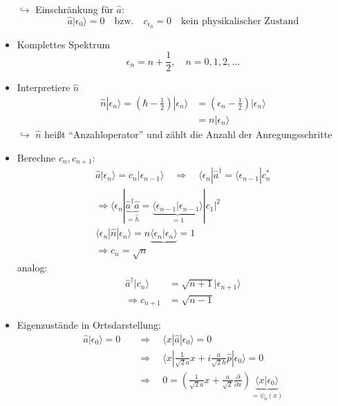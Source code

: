 \documentclass[10pt,article,colorback,accentcolor=tud9d]{scrartcl}
\begin{document}
\begin{itemize}
    $\hookrightarrow$ Einschränkung für $\hat{a}$:
    \begin{equation}
    \hat{a}|\epsilon_0\rangle=0 \quad \text{bzw.}\quad c_{\epsilon_0}=0 \quad \text{kein physikalischer Zustand}
    \end{equation}
  \item Komplettes Spektrum
    \begin{equation}
    \epsilon_n=n+\frac{1}{2},\quad n=0,1,2,...
    \end{equation}
  \item Interpretiere $\hat{n}$
    \begin{align}
    \hat{n}|\epsilon_n\rangle=\left(\hbar-\frac{1}{2}\right)|\epsilon_n\rangle&=\left(\epsilon_n-\frac{1}{2}\right)|\epsilon_n\rangle\\
    &=n|\epsilon_n\rangle
    \end{align}
    $\hookrightarrow$ $\hat{n}$ heißt "`Anzahloperator"' und zählt die Anzahl der Anregungsschritte
  \item Berechne $c_n,c_{n+1}$:
    \begin{align}
    \hat{a}|\epsilon_n\rangle=c_n|\epsilon_{n-1}\rangle\quad \Rightarrow \quad \langle\epsilon_n|\hat{a}^\dagger=\langle\epsilon_{n-1}|c_n^*\\
    \Rightarrow \langle \epsilon_n | \underbrace{\hat{a}^\dagger\hat{a}}_{=\hat{h}}=\underbrace{\langle\epsilon_{n-1}|\epsilon_{n-1}\rangle}_{=1}|c_1|^2\\
    \langle\epsilon_n|\hat{n}|\epsilon_n\rangle=n\underbrace{\langle\epsilon_n|\epsilon_n\rangle}{=1}\\
    \Rightarrow c_n=\sqrt{n}
    \end{align}
    analog:
    \begin{align}
    \hat{a}^\dagger|c_n\rangle&=\sqrt{n+1}|\epsilon_{n+1}\rangle\\
    \Rightarrow c_{n+1}&=\sqrt{n-1}
    \end{align}
  \item Eigenzustände in Ortsdarstellung:
    \begin{align}
    \hat{a}|\epsilon_0\rangle=0 \quad &\Rightarrow \quad \langle x|\hat{a}|\epsilon_0\rangle=0\\
    &\Rightarrow \quad \langle x|\frac{1}{\sqrt{2}a}\hat{x}+i\frac{a}{\sqrt{2}\hbar}\hat{p}|\epsilon_0\rangle=0\\
    &\Rightarrow \quad 0=\left(\frac{1}{\sqrt{2}a}x+\frac{a}{\sqrt{2}}\frac{\partial}{\partial x}\right)\underbrace{\langle x|\epsilon_0\rangle}_{=\psi_0(x)}\\

\end{align}
\end{itemize}
\end{document}
